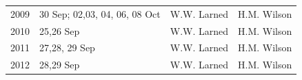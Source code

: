 \documentclass[]{article}
\begin{document}
\begin{longtable}[]{@{}llll@{}}
\begin{minipage}[t]{0.12\columnwidth}
2009\strut
\end{minipage} & \begin{minipage}[t]{0.38\columnwidth}\raggedright\strut
30 Sep; 02,03, 04, 06, 08 Oct\strut
\end{minipage} & \begin{minipage}[t]{0.18\columnwidth}\raggedright\strut
W.W. Larned\strut
\end{minipage} & \begin{minipage}[t]{0.20\columnwidth}\raggedright\strut
H.M. Wilson\strut
\end{minipage}\tabularnewline
\begin{minipage}[t]{0.12\columnwidth}\raggedright\strut
2010\strut
\end{minipage} & \begin{minipage}[t]{0.38\columnwidth}\raggedright\strut
25,26 Sep\strut
\end{minipage} & \begin{minipage}[t]{0.18\columnwidth}\raggedright\strut
W.W. Larned\strut
\end{minipage} & \begin{minipage}[t]{0.20\columnwidth}\raggedright\strut
H.M. Wilson\strut
\end{minipage}\tabularnewline
\begin{minipage}[t]{0.12\columnwidth}\raggedright\strut
2011\strut
\end{minipage} & \begin{minipage}[t]{0.38\columnwidth}\raggedright\strut
27,28, 29 Sep\strut
\end{minipage} & \begin{minipage}[t]{0.18\columnwidth}\raggedright\strut
W.W. Larned\strut
\end{minipage} & \begin{minipage}[t]{0.20\columnwidth}\raggedright\strut
H.M. Wilson\strut
\end{minipage}\tabularnewline
\begin{minipage}[t]{0.12\columnwidth}\raggedright\strut
2012\strut
\end{minipage} & \begin{minipage}[t]{0.38\columnwidth}\raggedright\strut
28,29 Sep\strut
\end{minipage} & \begin{minipage}[t]{0.18\columnwidth}\raggedright\strut
W.W. Larned\strut
\end{minipage} & \begin{minipage}[t]{0.20\columnwidth}\raggedright\strut
H.M. Wilson\strut

\end{minipage}
\end{longtable}
\end{document}
